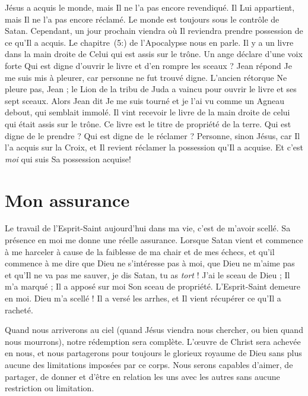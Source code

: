 Jésus a acquis le monde, mais Il ne l'a pas encore revendiqué.
 Il Lui appartient, mais Il ne l'a pas encore réclamé.
 Le monde est toujours sous le contrôle de Satan.
 Cependant, un jour prochain viendra où Il reviendra prendre possession
 de ce qu'Il a acquis.
 Le chapitre~(5:) de l'Apocalypse nous en parle.
 Il y a un livre dans la main droite de Celui qui est assis sur le trône.
 Un ange déclare d'une voix forte\frcolon{}
 \Og Qui est digne d'ouvrir le livre et d'en rompre les sceaux ? \Fg{}
 Jean répond\frcolon{} \Og Je me suis mis à pleurer,
 car personne ne fut trouvé digne. \Fg{}
 L'ancien rétorque\frcolon{} \Og Ne pleure pas, Jean ;
 le Lion de la tribu de Juda a vaincu pour ouvrir
 le livre et ses sept sceaux. \Fg{}
 Alors Jean dit\frcolon{} \Og Je me suis tourné et je l'ai vu comme un Agneau debout,
 qui semblait immolé. Il vint recevoir le livre de la main droite
 de celui qui était assis sur le trône. \Fg{}
 Ce livre est le titre de propriété de la terre.
 Qui est digne de le prendre ? Qui est digne de~le réclamer ?
 Personne, sinon Jésus, car Il l'a acquis sur la Croix, et Il revient
 réclamer la possession qu'Il a acquise.
 Et c'est \emph{moi} qui suis Sa possession acquise!


\section{Mon assurance}

Le travail de l'Esprit-Saint aujourd'hui dans ma vie, c'est de m'avoir scellé.
 Sa présence en moi me donne une réelle assurance.
 Lorsque Satan  vient et commence à me harceler à cause
 de la faiblesse de ma chair et de mes échecs,
 et qu'il commence à me dire que Dieu
 ne s'intéresse pas à moi, que Dieu ne m'aime pas et qu'Il ne va pas
 me sauver, je dis\frcolon{}
 \Og Satan, tu as \emph{tort} ! J'ai le sceau de Dieu ; Il m'a marqué ;
 Il a apposé sur moi Son sceau de propriété. L'Esprit-Saint demeure en moi.
 Dieu m'a scellé ! Il a versé les arrhes, et Il vient récupérer
 ce qu'Il a racheté. \Fg{}

Quand nous arriverons au ciel (quand Jésus viendra nous chercher,
 ou bien quand nous mourrons), notre rédemption sera complète.
 L'œu\-vre de Christ sera achevée en nous, et nous partagerons pour
 toujours le glorieux royaume de Dieu sans plus aucune des limitations
 imposées par ce corps. Nous serons capables d'aimer, de partager, de donner
 et d'être en relation les uns avec les autres sans aucune restriction
 ou limitation.

